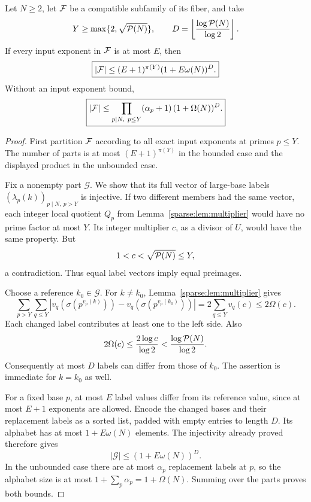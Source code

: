 \begin{theorem}\label{sparse:thm:finite}
Let $N\ge2$, let $\mathcal F$ be a compatible subfamily of its fiber, and take
\[
 Y\ge\max\{2,\sqrt{\mathcal P(N)}\},\qquad
 D=\left\lfloor\frac{\log\mathcal P(N)}{\log2}\right\rfloor.
\]
If every input exponent in $\mathcal F$ is at most $E$, then
\begin{equation}\label{sparse:eq:finiteE}
 \boxed{|\mathcal F|\le (E+1)^{\pi(Y)}(1+E\omega(N))^D.}
\end{equation}
Without an input exponent bound,
\begin{equation}\label{sparse:eq:finiteunbounded}
 \boxed{|\mathcal F|\le
 \prod_{p\mid N,\ p\le Y}(\alpha_p+1)\,
 (1+\Omega(N))^D.}
\end{equation}
\end{theorem}
\begin{proof}
First partition $\mathcal F$ according to all exact input exponents at primes $p\le Y$. The number of parts is at most $(E+1)^{\pi(Y)}$ in the bounded case and the displayed product in the unbounded case.

Fix a nonempty part $\mathcal G$. We show that its full vector of large-base labels $(\lambda_p(k))_{p\mid N,\ p>Y}$ is injective. If two different members had the same vector, each integer local quotient $Q_p$ from Lemma~\ref{sparse:lem:multiplier} would have no prime factor at most $Y$. Its integer multiplier $c$, as a divisor of $U$, would have the same property. But
\[
 1<c<\sqrt{\mathcal P(N)}\le Y,
\]
a contradiction. Thus equal label vectors imply equal preimages.

Choose a reference $k_0\in\mathcal G$. For $k\ne k_0$, Lemma~\ref{sparse:lem:multiplier} gives
\[
 \sum_{p>Y}\sum_{q\le Y}
 \left|v_q(\sigma(p^{v_p(k)}))-v_q(\sigma(p^{v_p(k_0)}))\right|
 =2\sum_{q\le Y}v_q(c)\le2\Omega(c).
\]
Each changed label contributes at least one to the left side. Also
\[
 2\Omega(c)\le\frac{2\log c}{\log2}
 <\frac{\log\mathcal P(N)}{\log2}.
\]
Consequently at most $D$ labels can differ from those of $k_0$. The assertion is immediate for $k=k_0$ as well.

For a fixed base $p$, at most $E$ label values differ from its reference value, since at most $E+1$ exponents are allowed. Encode the changed bases and their replacement labels as a sorted list, padded with empty entries to length $D$. Its alphabet has at most $1+E\omega(N)$ elements. The injectivity already proved therefore gives
\[
 |\mathcal G|\le(1+E\omega(N))^D.
\]
In the unbounded case there are at most $\alpha_p$ replacement labels at $p$, so the alphabet size is at most $1+\sum_p\alpha_p=1+\Omega(N)$. Summing over the parts proves both bounds.
\end{proof}


